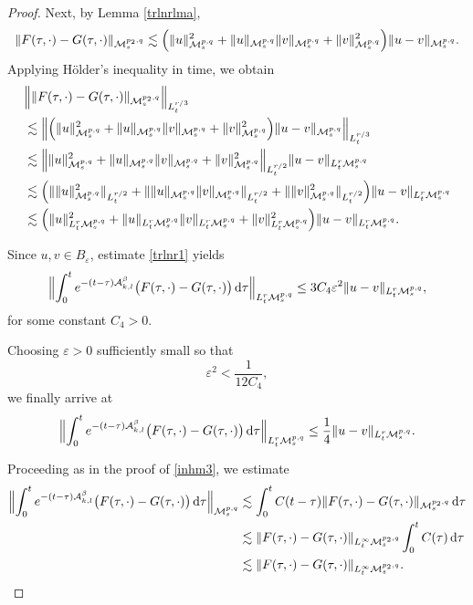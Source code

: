 \documentclass[12pt,reqno,a4paper]{amsart}
\numberwithin{equation}{section}
\theoremstyle{plain}
\theoremstyle{definition}
\theoremstyle{remark}
\def\M{\mathcal{M}}
\def \Ad{\mathcal{A}_{k,l}}
\def \M{{\mathcal M}}
\begin{document}
\begin{proof}
Next, by Lemma \ref{trlnrlma},
\begin{align*}
\|F(\tau,\cdot)-G(\tau,\cdot)\|_{\M^{p_{2},q}_{s}}
\lesssim
\Bigl(
\|u\|_{\M^{p,q}_{s}}^{2}
+
\|u\|_{\M^{p,q}_{s}}
\|v\|_{\M^{p,q}_{s}}
+
\|v\|_{\M^{p,q}_{s}}^{2}
\Bigr)
\|u-v\|_{\M^{p,q}_{s}}.
\end{align*}
Applying Hölder's inequality in time, we obtain
\begin{align*}
&
\Bigl\|
\|F(\tau,\cdot)-G(\tau,\cdot)\|_{\M^{p_{2},q}_{s}}
\Bigr\|_{L^{r/3}_{t}}
\\
&\lesssim
\Bigl\|
\Bigl(
\|u\|_{\M^{p,q}_{s}}^{2}
+
\|u\|_{\M^{p,q}_{s}}
\|v\|_{\M^{p,q}_{s}}
+
\|v\|_{\M^{p,q}_{s}}^{2}
\Bigr)
\|u-v\|_{\M^{p,q}_{s}}
\Bigr\|_{L^{r/3}_{t}}
\\
&\lesssim
\Bigl\|
\|u\|_{\M^{p,q}_{s}}^{2}
+
\|u\|_{\M^{p,q}_{s}}
\|v\|_{\M^{p,q}_{s}}
+
\|v\|_{\M^{p,q}_{s}}^{2}
\Bigr\|_{L^{r/2}_{t}}
\|u-v\|_{L^{r}_{t}\M^{p,q}_{s}}
\\
&\lesssim
\Bigl(
\|\|u\|_{\M^{p,q}_{s}}^{2}\|_{L^{r/2}_{t}}
+
\|\|u\|_{\M^{p,q}_{s}}
\|v\|_{\M^{p,q}_{s}}\|_{L^{r/2}_{t}}
+
\|\|v\|_{\M^{p,q}_{s}}^{2}\|_{L^{r/2}_{t}}
\Bigr)
\|u-v\|_{L^{r}_{t}\M^{p,q}_{s}}
\\
&\lesssim
\Bigl(
\|u\|_{L^{r}_{t}\M^{p,q}_{s}}^{2}
+
\|u\|_{L^{r}_{t}\M^{p,q}_{s}}
\|v\|_{L^{r}_{t}\M^{p,q}_{s}}
+
\|v\|_{L^{r}_{t}\M^{p,q}_{s}}^{2}
\Bigr)
\|u-v\|_{L^{r}_{t}\M^{p,q}_{s}}.
\end{align*}

Since $u,v\in B_{\varepsilon}$, estimate \eqref{trlnr1} yields
\begin{align*}
\Bigl\|
\int_{0}^{t}
e^{-(t-\tau)\Ad^{\beta}}
\bigl(F(\tau,\cdot)-G(\tau,\cdot)\bigr)
\,\mathrm{d}\tau
\Bigr\|_{L^{r}_{t}\M^{p,q}_{s}}
\leq
3C_{4}\varepsilon^{2}
\|u-v\|_{L^{r}_{t}\M^{p,q}_{s}},
\end{align*}
for some constant $C_{4}>0$.

Choosing $\varepsilon>0$ sufficiently small so that
\[
\varepsilon^{2}
<
\frac{1}{12C_{4}},
\]
we finally arrive at
\begin{align}
\label{123}
\Bigl\|
\int_{0}^{t}
e^{-(t-\tau)\Ad^{\beta}}
\bigl(F(\tau,\cdot)-G(\tau,\cdot)\bigr)
\,\mathrm{d}\tau
\Bigr\|_{L^{r}_{t}\M^{p,q}_{s}}
\leq
\frac{1}{4}
\|u-v\|_{L^{r}_{t}\M^{p,q}_{s}}.
\end{align}




Proceeding as in the proof of \eqref{inhm3}, we estimate
\begin{align}
\label{10}
\Bigl\|
\int_{0}^{t}
e^{-(t-\tau)\Ad^{\beta}}
\bigl(F(\tau,\cdot)-G(\tau,\cdot)\bigr)
\,\mathrm{d}\tau
\Bigr\|_{\M^{p,q}_{s}}
&\lesssim
\int_{0}^{t}
C(t-\tau)
\|F(\tau,\cdot)-G(\tau,\cdot)\|_{\M^{p_{2},q}_{s}}
\,\mathrm{d}\tau
\nonumber\\
&\lesssim
\|F(\tau,\cdot)-G(\tau,\cdot)\|_{L^{\infty}_{t}\M^{p_{2},q}_{s}}
\int_{0}^{t}
C(\tau)\,\mathrm{d}\tau
\nonumber\\
&\lesssim
\|F(\tau,\cdot)-G(\tau,\cdot)\|_{L^{\infty}_{t}\M^{p_{2},q}_{s}}.
\end{align}


\end{proof}
\end{document}
